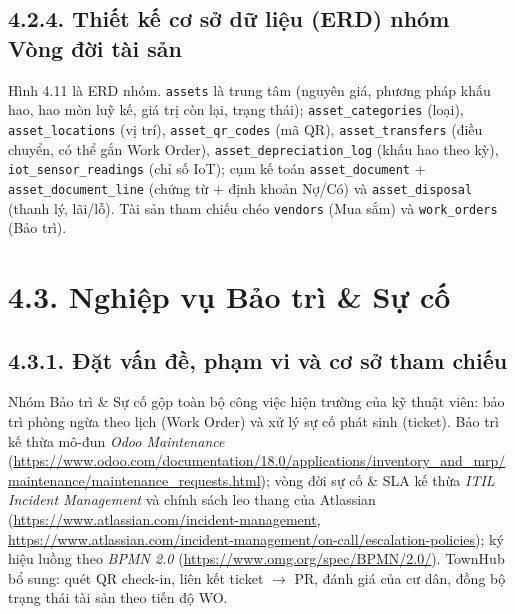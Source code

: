 
\subsection*{4.2.4. Thiết kế cơ sở dữ liệu (ERD) nhóm Vòng đời tài sản}
Hình 4.11 là ERD nhóm. \texttt{assets} là trung tâm (nguyên giá, phương pháp khấu hao, hao mòn luỹ kế, giá trị còn lại, trạng thái); \texttt{asset\_categories} (loại), \texttt{asset\_locations} (vị trí), \texttt{asset\_qr\_codes} (mã QR), \texttt{asset\_transfers} (điều chuyển, có thể gắn Work Order), \texttt{asset\_depreciation\_log} (khấu hao theo kỳ), \texttt{iot\_sensor\_readings} (chỉ số IoT); cụm kế toán \texttt{asset\_document} + \texttt{asset\_document\_line} (chứng từ + định khoản Nợ/Có) và \texttt{asset\_disposal} (thanh lý, lãi/lỗ). Tài sản tham chiếu chéo \texttt{vendors} (Mua sắm) và \texttt{work\_orders} (Bảo trì).


\section*{4.3. Nghiệp vụ Bảo trì \& Sự cố}
\subsection*{4.3.1. Đặt vấn đề, phạm vi và cơ sở tham chiếu}
Nhóm Bảo trì \& Sự cố gộp toàn bộ công việc hiện trường của kỹ thuật viên: bảo trì phòng ngừa theo lịch (Work Order) và xử lý sự cố phát sinh (ticket). Bảo trì kế thừa mô-đun \emph{Odoo Maintenance} (\url{https://www.odoo.com/documentation/18.0/applications/inventory_and_mrp/maintenance/maintenance_requests.html}); vòng đời sự cố \& SLA kế thừa \emph{ITIL Incident Management} và chính sách leo thang của Atlassian (\url{https://www.atlassian.com/incident-management}, \url{https://www.atlassian.com/incident-management/on-call/escalation-policies}); ký hiệu luồng theo \emph{BPMN 2.0} (\url{https://www.omg.org/spec/BPMN/2.0/}). TownHub bổ sung: quét QR check-in, liên kết ticket $\rightarrow$ PR, đánh giá của cư dân, đồng bộ trạng thái tài sản theo tiến độ WO.

